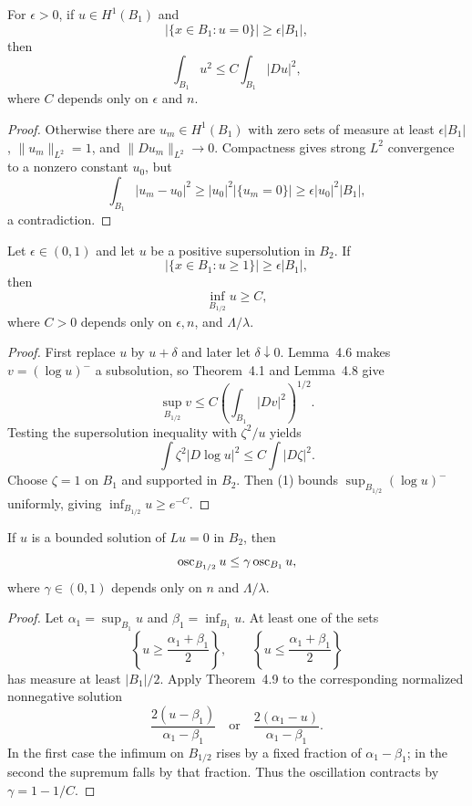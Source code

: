 \begin{lemma}\label{hanlin:weaksol-part2-poincare-sobolev-zero-set}
For $\epsilon>0$, if $u\in H^1(B_1)$ and
\[
|\{x\in B_1:u=0\}|\geq\epsilon|B_1|,
\]
then
\[
\int_{B_1}u^2\leq C\int_{B_1}|Du|^2,
\]
where $C$ depends only on $\epsilon$ and $n$.
\end{lemma}
\begin{proof}
\sketch Otherwise there are $u_m\in H^1(B_1)$ with zero sets of measure
at least $\epsilon|B_1|$, $\|u_m\|_{L^2}=1$, and
$\|Du_m\|_{L^2}\to0$. Compactness gives strong $L^2$ convergence to a
nonzero constant $u_0$, but
\[
\int_{B_1}|u_m-u_0|^2
\geq|u_0|^2|\{u_m=0\}|\geq\epsilon|u_0|^2|B_1|,
\]
a contradiction.
\end{proof}

\begin{theorem}\label{hanlin:weaksol-part2-density-theorem}
Let $\epsilon\in(0,1)$ and let $u$ be a positive supersolution in $B_2$.
If
\[
|\{x\in B_1:u\geq1\}|\geq\epsilon|B_1|,
\]
then
\[
\inf_{B_{1/2}}u\geq C,
\]
where $C>0$ depends only on $\epsilon,n$, and $\Lambda/\lambda$.
\end{theorem}
\begin{proof}
\sketch First replace $u$ by $u+\delta$ and later let $\delta\downarrow0$.
Lemma~4.6 makes $v=(\log u)^-$ a subsolution, so Theorem~4.1 and
Lemma~4.8 give
\[
\sup_{B_{1/2}}v
\leq C\left(\int_{B_1}|Dv|^2\right)^{1/2}.
\tag{1}
\]
Testing the supersolution inequality with $\zeta^2/u$ yields
\[
\int\zeta^2|D\log u|^2\leq C\int|D\zeta|^2.
\]
Choose $\zeta=1$ on $B_1$ and supported in $B_2$. Then (1) bounds
$\sup_{B_{1/2}}(\log u)^-$ uniformly, giving
$\inf_{B_{1/2}}u\geq e^{-C}$.
\end{proof}

\begin{theorem}\label{hanlin:weaksol-part2-oscillation-decay}
If $u$ is a bounded solution of $Lu=0$ in $B_2$, then
\[
\operatorname{osc}_{B_{1/2}}u\leq\gamma\operatorname{osc}_{B_1}u,
\]
where $\gamma\in(0,1)$ depends only on $n$ and $\Lambda/\lambda$.
\end{theorem}
\begin{proof}
\sketch Let $\alpha_1=\sup_{B_1}u$ and $\beta_1=\inf_{B_1}u$. At least
one of the sets
\[
\left\{u\geq\frac{\alpha_1+\beta_1}{2}\right\},
\qquad
\left\{u\leq\frac{\alpha_1+\beta_1}{2}\right\}
\]
has measure at least $|B_1|/2$. Apply Theorem~4.9 to the corresponding
normalized nonnegative solution
\[
\frac{2(u-\beta_1)}{\alpha_1-\beta_1}
\quad\text{or}\quad
\frac{2(\alpha_1-u)}{\alpha_1-\beta_1}.
\]
In the first case the infimum on $B_{1/2}$ rises by a fixed fraction of
$\alpha_1-\beta_1$; in the second the supremum falls by that fraction.
Thus the oscillation contracts by $\gamma=1-1/C$.
\end{proof}

